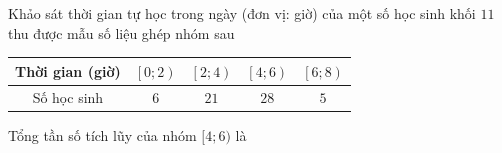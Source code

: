 \begin{ex}%
Khảo sát thời gian tự học trong ngày (đơn vị: giờ) của một số học sinh khối $11$ thu được mẫu số liệu ghép nhóm sau
\begin{center}
\begin{tabular}{|c|c|c|c|c|}
\hline
Thời gian (giờ)& $\left[0;2\right)$ & $\left[2;4\right)$  & $\left[4;6\right)$&$\left[6;8\right)$ \\
\hline
Số học sinh& $6$ & $21$ &$28$  & $5$ \\
\hline
\end{tabular}
\end{center}
Tổng tần số tích lũy của nhóm $[ 4;6 )$ là
\loigiai{
Tổng tần số tích lũy của nhóm $[ 4;6 )$ là $6+21+28=55$.
} 
\end{ex}

